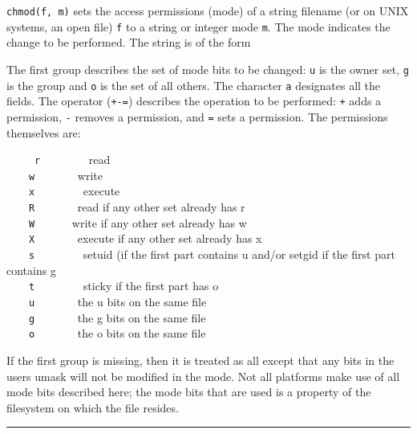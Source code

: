 \noindent
{}\texttt{chmod(f,
m)} sets the access permissions ({\textquotedbl}mode{\textquotedbl}) of
a string filename (or on UNIX systems, an open file) \texttt{f} to a
string or integer mode \texttt{m}. The mode indicates the change to be
performed. The string is of the form

\iconcode{
\>   [ugoa]*[+-=][rwxRWXstugo]* }

The first group describes the set of mode bits to be changed: \texttt{u}
is the owner set, \texttt{g} is the group and \texttt{o} is the set of
all others. The character \texttt{a} designates all the fields. The
operator (\texttt{+-=}) describes the operation to be performed:
\texttt{+} adds a permission, \texttt{{}-} removes a permission, and
\texttt{=} sets a permission. The permissions themselves are: 

\ \ \ \ \ \texttt{r} \ \ \ \ \ \ \ \ read\\
 \ \ \ \ \texttt{w} \ \ \ \ \ \ \ write\\
 \ \ \ \ \texttt{x} \ \ \ \ \ \ \ \ execute\\
 \ \ \ \ \texttt{R} \ \ \ \ \ \ \ read if any other set already has
r\\
 \ \ \ \ \texttt{W} \ \ \ \ \ \ write if any other set already has
w\\
 \ \ \ \ \texttt{X} \ \ \ \ \ \ \ execute if any other set already has
x\\
 \ \ \ \ \texttt{s} \ \ \ \ \ \ \ \ setuid (if the first part contains u
and/or setgid if the first part contains g\\
 \ \ \ \ \texttt{t} \ \ \ \ \ \ \ \ sticky if the first part has
o\\
 \ \ \ \ \texttt{u} \ \ \ \ \ \ \ the u bits on the same file\\
 \ \ \ \ \texttt{g} \ \ \ \ \ \ \ the g bits on the same file\\
 \ \ \ \ \texttt{o} \ \ \ \ \ \ \ the o bits on the same file

If the first group is missing, then it is treated as
{\textquotedbl}all{\textquotedbl} except that any bits in the
user{\textquotesingle}s umask will not be modified in the mode. Not all
platforms make use of all mode bits described here; the mode bits that
are used is a property of the filesystem on which the file resides.

\bigskip\hrule\vspace{0.1cm}

